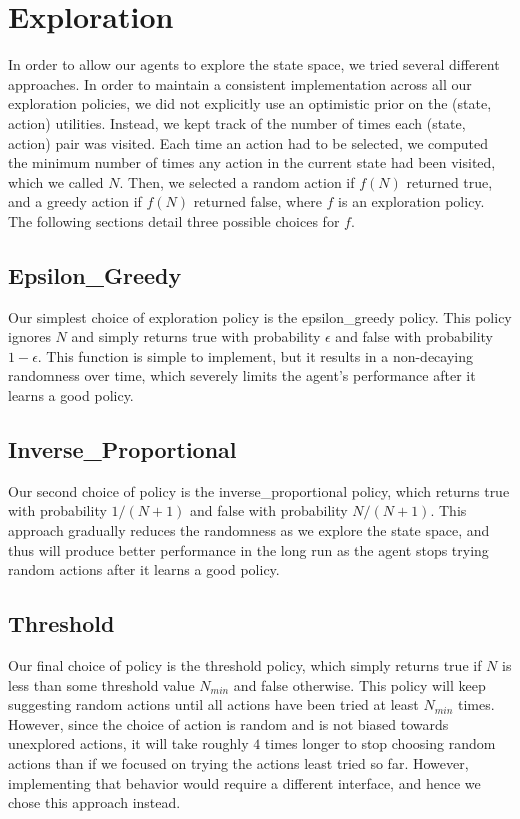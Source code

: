 \documentclass[journal,hidelinks]{IEEEtran}
\begin{document}
\section{Exploration}

In order to allow our agents to explore the state space, we tried several different approaches. In order to maintain a consistent implementation across all our exploration policies, we did not explicitly use an optimistic prior on the (state, action) utilities. Instead, we kept track of the number of times each (state, action) pair was visited. Each time an action had to be selected, we computed the minimum number of times any action in the current state had been visited, which we called $N$. Then, we selected a random action if $f(N)$ returned true, and a greedy action if $f(N)$ returned false, where $f$ is an exploration policy. The following sections detail three possible choices for $f$.

\subsection{Epsilon\_Greedy}

Our simplest choice of exploration policy is the epsilon\_greedy policy. This policy ignores $N$ and simply returns true with probability $\epsilon$ and false with probability $1-\epsilon$. This function is simple to implement, but it results in a non-decaying randomness over time, which severely limits the agent's performance after it learns a good policy.

\subsection{Inverse\_Proportional}

Our second choice of policy is the inverse\_proportional policy, which returns true with probability $1/(N+1)$ and false with probability $N/(N+1)$. This approach gradually reduces the randomness as we explore the state space, and thus will produce better performance in the long run as the agent stops trying random actions after it learns a good policy.

\subsection{Threshold}

Our final choice of policy is the threshold policy, which simply returns true if $N$ is less than some threshold value $N_{min}$ and false otherwise. This policy will keep suggesting random actions until all actions have been tried at least $N_{min}$ times. However, since the choice of action is random and is not biased towards unexplored actions, it will take roughly $4$ times longer to stop choosing random actions than if we focused on trying the actions least tried so far. However, implementing that behavior would require a different interface, and hence we chose this approach instead.
\end{document}
